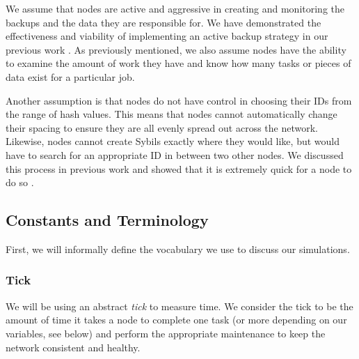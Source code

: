 \documentclass[10pt,conference]{IEEEtran}
\begin{document}
We assume that nodes are active and aggressive in creating and monitoring the backups and the data they are responsible for.
We have demonstrated the effectiveness and viability of implementing an active backup strategy in our previous work \cite{chordreduce}.
As previously mentioned, we also assume nodes have the ability to examine the amount of work they have and know how many tasks or pieces of data exist for a particular job.

Another assumption is that nodes do not have control in choosing their IDs from the range of hash values.
This means that nodes cannot automatically change their spacing to ensure they are all evenly spread out across the network.
Likewise, nodes cannot create Sybils exactly where they would like, but would have to search for an appropriate ID in between two other nodes.
We discussed this process in previous work and showed that it is extremely quick for a node to do so \cite{sybil-analysis}.





%
%
%


\subsection{Constants and Terminology}

First, we will informally define the vocabulary we use to discuss our simulations.

\subsubsection*{Tick} 
We will be using an abstract \textit{tick} to measure time.  
We consider the tick to be the amount of time it takes a node to complete one task (or more depending on our variables, see below) and perform the appropriate maintenance to keep the network consistent and healthy.
\end{document}
